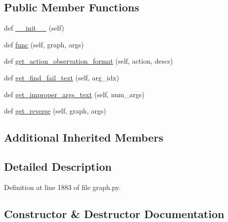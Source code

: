 \subsection*{Public Member Functions}
\begin{DoxyCompactItemize}
\item 
def \hyperlink{classlight__chats_1_1graph_1_1ExamineFunction_a7a65285c10c54ae332ee6252dca6cbe1}{\+\_\+\+\_\+init\+\_\+\+\_\+} (self)
\item 
def \hyperlink{classlight__chats_1_1graph_1_1ExamineFunction_a5a9150659aa698ebf73e302056c5ba46}{func} (self, graph, args)
\item 
def \hyperlink{classlight__chats_1_1graph_1_1ExamineFunction_ae3397289f3f0751980ba2a2165af82dc}{get\+\_\+action\+\_\+observation\+\_\+format} (self, action, descs)
\item 
def \hyperlink{classlight__chats_1_1graph_1_1ExamineFunction_a0f0eedfae1c6a0cdf83f94c6bc709128}{get\+\_\+find\+\_\+fail\+\_\+text} (self, arg\+\_\+idx)
\item 
def \hyperlink{classlight__chats_1_1graph_1_1ExamineFunction_a93ba8b835d12b96746a1548583e62887}{get\+\_\+improper\+\_\+args\+\_\+text} (self, num\+\_\+args)
\item 
def \hyperlink{classlight__chats_1_1graph_1_1ExamineFunction_ab489f99594157bdf84e8c67e7f9504bc}{get\+\_\+reverse} (self, graph, args)
\end{DoxyCompactItemize}
\subsection*{Additional Inherited Members}


\subsection{Detailed Description}
\begin{DoxyVerb}\end{DoxyVerb}
 

Definition at line 1883 of file graph.\+py.



\subsection{Constructor \& Destructor Documentation}
\mbox{\label{classlight__chats_1_1graph_1_1ExamineFunction_a7a65285c10c54ae332ee6252dca6cbe1}} 
